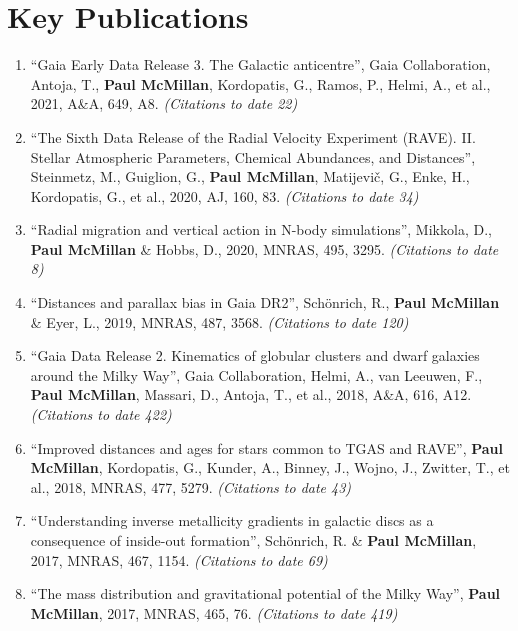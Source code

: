 \documentclass{resume}
\begin{document}
\section*{Key Publications}

\begin{enumerate}
\item ``Gaia Early Data Release 3. The Galactic anticentre'', Gaia Collaboration, Antoja, T., \textbf{Paul McMillan}, Kordopatis, G., Ramos, P., Helmi, A., et al., 2021, A\&A, 649, A8. \textit{(Citations to date 22)}

\item ``The Sixth Data Release of the Radial Velocity Experiment (RAVE). II. Stellar Atmospheric Parameters, Chemical Abundances, and Distances'', Steinmetz, M., Guiglion, G., \textbf{Paul McMillan}, Matijevi\v{c}, G., Enke, H., Kordopatis, G., et al., 2020, AJ, 160, 83. \textit{(Citations to date 34)}

\item ``Radial migration and vertical action in N-body simulations'', Mikkola, D., \textbf{Paul McMillan} \& Hobbs, D., 2020, MNRAS, 495, 3295. \textit{(Citations to date 8)}

\item ``Distances and parallax bias in Gaia DR2'', Sch\"onrich, R., \textbf{Paul McMillan} \& Eyer, L., 2019, MNRAS, 487, 3568. \textit{(Citations to date 120)}

\item ``Gaia Data Release 2. Kinematics of globular clusters and dwarf galaxies around the Milky Way'', Gaia Collaboration, Helmi, A., van Leeuwen, F., \textbf{Paul McMillan}, Massari, D., Antoja, T., et al., 2018, A\&A, 616, A12. \textit{(Citations to date 422)}

\item ``Improved distances and ages for stars common to TGAS and RAVE'', \textbf{Paul McMillan}, Kordopatis, G., Kunder, A., Binney, J., Wojno, J., Zwitter, T., et al., 2018, MNRAS, 477, 5279. \textit{(Citations to date 43)}

\item ``Understanding inverse metallicity gradients in galactic discs as a consequence of inside-out formation'', Sch\"onrich, R. \& \textbf{Paul McMillan}, 2017, MNRAS, 467, 1154. \textit{(Citations to date 69)}

\item ``The mass distribution and gravitational potential of the Milky Way'', \textbf{Paul McMillan}, 2017, MNRAS, 465, 76. \textit{(Citations to date 419)}


\end{enumerate}
\end{document}
